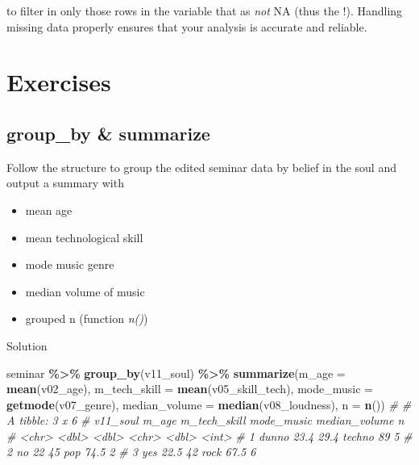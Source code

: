 \documentclass[
]{book}
\newenvironment{Shaded}{\begin{snugshade}}{\end{snugshade}}
\newcommand{\AttributeTok}[1]{\textcolor[rgb]{0.13,0.29,0.53}{#1}}
\newcommand{\CommentTok}[1]{\textcolor[rgb]{0.56,0.35,0.01}{\textit{#1}}}
\newcommand{\FunctionTok}[1]{\textcolor[rgb]{0.13,0.29,0.53}{\textbf{#1}}}
\newcommand{\NormalTok}[1]{#1}
\newcommand{\SpecialCharTok}[1]{\textcolor[rgb]{0.81,0.36,0.00}{\textbf{#1}}}
\providecommand{\tightlist}{%
  \setlength{\itemsep}{0pt}\setlength{\parskip}{0pt}}
\begin{document}
to filter in only those rows in the variable that as \emph{not} NA (thus the !).
Handling missing data properly ensures that your analysis is accurate and reliable.

\section*{Exercises}\label{exercises-2}

\subsection*{group\_by \& summarize}\label{group_by-summarize-2}

Follow the structure to group the edited seminar data by belief in the soul and output a summary with

\begin{itemize}
\tightlist
\item
  mean age
\item
  mean technological skill
\item
  mode music genre
\item
  median volume of music
\item
  grouped n (function \emph{n()})
\end{itemize}

Solution

\begin{Shaded}
\begin{Highlighting}[]
\NormalTok{seminar }\SpecialCharTok{\%\textgreater{}\%} 
  \FunctionTok{group\_by}\NormalTok{(v11\_soul) }\SpecialCharTok{\%\textgreater{}\%} 
  \FunctionTok{summarize}\NormalTok{(}\AttributeTok{m\_age =} \FunctionTok{mean}\NormalTok{(v02\_age),}
            \AttributeTok{m\_tech\_skill =} \FunctionTok{mean}\NormalTok{(v05\_skill\_tech),}
            \AttributeTok{mode\_music =} \FunctionTok{getmode}\NormalTok{(v07\_genre),}
            \AttributeTok{median\_volume =} \FunctionTok{median}\NormalTok{(v08\_loudness),}
            \AttributeTok{n =} \FunctionTok{n}\NormalTok{())}
\CommentTok{\# \# A tibble: 3 x 6}
\CommentTok{\#   v11\_soul m\_age m\_tech\_skill mode\_music median\_volume     n}
\CommentTok{\#   \textless{}chr\textgreater{}    \textless{}dbl\textgreater{}        \textless{}dbl\textgreater{} \textless{}chr\textgreater{}              \textless{}dbl\textgreater{} \textless{}int\textgreater{}}
\CommentTok{\# 1 dunno     23.4         29.4 techno              89       5}
\CommentTok{\# 2 no        22           45   pop                 74.5     2}
\CommentTok{\# 3 yes       22.5         42   rock                67.5     6}
\end{Highlighting}
\end{Shaded}
\end{document}
